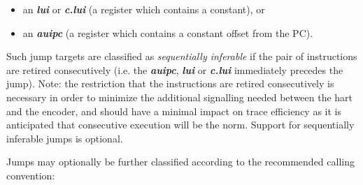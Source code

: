 \begin{itemize}
  \item an \textbf{\textit{lui}} or \textbf{\textit{c.lui}} (a register which contains a constant), or
  \item an \textbf{\textit{auipc}} (a register which contains a constant offset from the PC).
\end{itemize}

Such jump targets are classified as \textit{sequentially inferable} if the pair of instructions are retired consecutively 
(i.e. the \textbf{\textit{auipc}}, \textbf{\textit{lui}} or \textbf{\textit{c.lui}} immediately precedes the jump).  Note:
the restriction that the instructions are retired consecutively is necessary in order to minimize the additional signalling
needed between the hart and the encoder, and should have a minimal impact on trace efficiency as it is anticipated that
consecutive execution will be the norm. Support for sequentially inferable jumps is optional.

Jumps may optionally be further classified according to the recommended calling convention:


